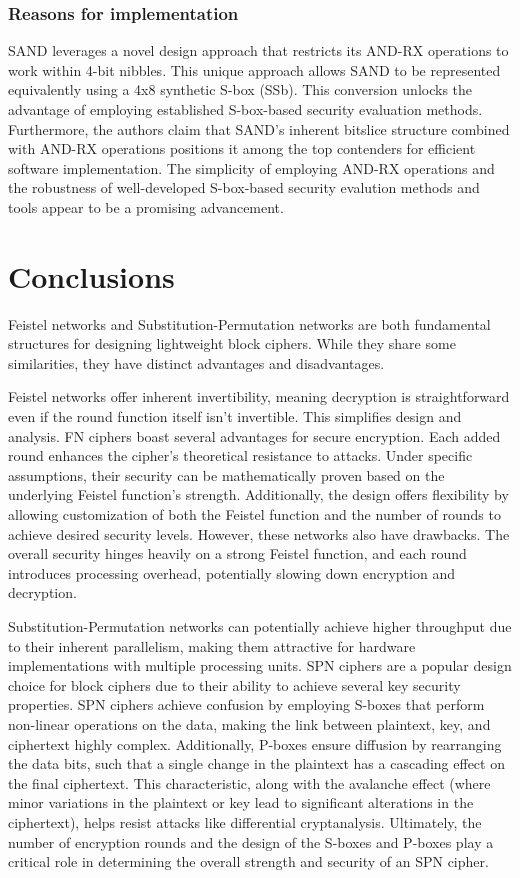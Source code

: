 \documentclass[conference]{IEEEtran}
\begin{document}
\subsubsection{Reasons for implementation}
SAND leverages a novel design approach that restricts its AND-RX operations to work within 4-bit nibbles. This unique approach allows SAND to be represented equivalently using a 4x8 synthetic S-box (SSb). This conversion unlocks the advantage of employing established S-box-based security evaluation methods. Furthermore, the authors claim that SAND's inherent bitslice structure combined with AND-RX operations positions it among the top contenders for efficient software implementation. The simplicity of employing AND-RX operations and the robustness of well-developed S-box-based security evalution methods and tools appear to be a promising advancement.

\section{Conclusions}
Feistel networks and Substitution-Permutation networks are both fundamental structures for designing lightweight block ciphers. While they share some similarities, they have distinct advantages and disadvantages.

Feistel networks offer inherent invertibility, meaning decryption is straightforward even if the round function itself isn't invertible. This simplifies design and analysis. FN ciphers boast several advantages for secure encryption. Each added round enhances the cipher's theoretical resistance to attacks. Under specific assumptions, their security can be mathematically proven based on the underlying Feistel function's strength. Additionally, the design offers flexibility by allowing customization of both the Feistel function and the number of rounds to achieve desired security levels. However, these networks also have drawbacks. The overall security hinges heavily on a strong Feistel function, and each round introduces processing overhead, potentially slowing down encryption and decryption.

Substitution-Permutation networks can potentially achieve higher throughput due to their inherent parallelism, making them attractive for hardware implementations with multiple processing units. SPN ciphers are a popular design choice for block ciphers due to their ability to achieve several key security properties.  SPN ciphers achieve confusion by employing S-boxes that perform non-linear operations on the data, making the link between plaintext, key, and ciphertext highly complex. Additionally, P-boxes ensure diffusion by rearranging the data bits, such that a single change in the plaintext has a cascading effect on the final ciphertext. This characteristic, along with the avalanche effect (where minor variations in the plaintext or key lead to significant alterations in the ciphertext), helps resist attacks like differential cryptanalysis. Ultimately, the number of encryption rounds and the design of the S-boxes and P-boxes play a critical role in determining the overall strength and security of an SPN cipher.
\end{document}
